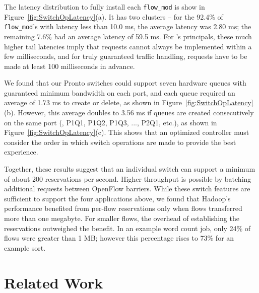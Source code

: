 The latency distribution to fully install each \verb/flow_mod/ is show in
Figure~\ref{fig:SwitchOpLatency}(a). It has two clusters -- for the 92.4\% of
\verb/flow_mod/'s with latency less than 10.0 ms, the average latency
was 2.80 ms; the remaining 7.6\% had an average latency of 59.5 ms.
For \sys's principals, these much higher tail latencies imply that requests
cannot always be implemented within a few milliseconds, and for truly
guaranteed traffic handling, requests have to be made at least 100
milliseconds in advance.

We found that our Pronto switches could support seven hardware
queues with guaranteed minimum bandwidth on each port, and each
queue required an average of 1.73 ms to create or delete, as shown in
Figure~\ref{fig:SwitchOpLatency}(b). However, this average doubles to 3.56 ms
if queues are created consecutively on the same port (\ie, P1Q1, P1Q2,
P1Q3, ..., P2Q1, etc.), as shown in Figure~\ref{fig:SwitchOpLatency}(c).
This shows that an optimized \sys controller must consider the order in
which switch operations are made to provide the best experience.%

Together, these results suggest that an
individual switch can support a minimum of about 200 reservations
per second. Higher throughput is possible by batching additional requests
between OpenFlow barriers.
While these switch features are sufficient to support the four applications
above, we found that Hadoop's performance benefited from per-flow
reservations only when flows transferred more than one megabyte. For
smaller flows, the overhead of establishing the reservations outweighed
the benefit.
In an example word count job, only 24\% of flows were greater
than 1 MB; however this percentage rises to 73\% for an example sort.

\section{Related Work}
\label{sec:related-work}




